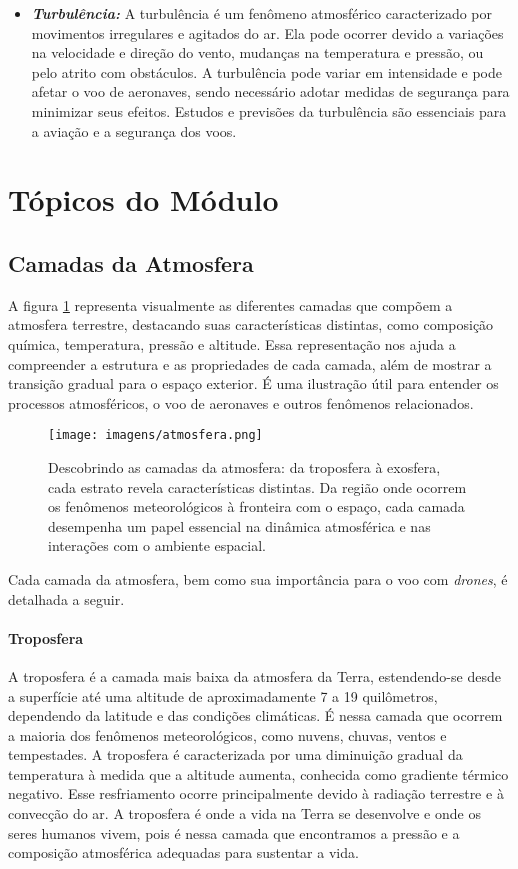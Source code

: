 \documentclass[a4paper, 12pt, onecolumn,singlespacing]{article}
\begin{document}
\begin{itemize}
		\item \textbf{\textit{Turbulência: }} A turbulência é um fenômeno atmosférico caracterizado por movimentos irregulares e agitados do ar. Ela pode ocorrer devido a variações na velocidade e direção do vento, mudanças na temperatura e pressão, ou pelo atrito com obstáculos. A turbulência pode variar em intensidade e pode afetar o voo de aeronaves, sendo necessário adotar medidas de segurança para minimizar seus efeitos. Estudos e previsões da turbulência são essenciais para a aviação e a segurança dos voos.
		
	\end{itemize}

	\section{Tópicos do Módulo}
	
	\subsection{Camadas da Atmosfera}
	
	A figura \ref{fig:atmosfera} representa visualmente as diferentes camadas que compõem a atmosfera terrestre, destacando suas características distintas, como composição química, temperatura, pressão e altitude. Essa representação nos ajuda a compreender a estrutura e as propriedades de cada camada, além de mostrar a transição gradual para o espaço exterior. É uma ilustração útil para entender os processos atmosféricos, o voo de aeronaves e outros fenômenos relacionados.
	
	\begin{figure}[h]
		\centering
		\texttt{[image: imagens/atmosfera.png]}
		\caption{Descobrindo as camadas da atmosfera: da troposfera à exosfera, cada estrato revela características distintas. Da região onde ocorrem os fenômenos meteorológicos à fronteira com o espaço, cada camada desempenha um papel essencial na dinâmica atmosférica e nas interações com o ambiente espacial.}
		\label{fig:atmosfera}
	\end{figure}

	Cada camada da atmosfera, bem como sua importância para o voo com \textit{drones}, é detalhada a seguir.		
		
	\paragraph{Troposfera} A troposfera é a camada mais baixa da atmosfera da Terra, estendendo-se desde a superfície até uma altitude de aproximadamente 7 a 19 quilômetros, dependendo da latitude e das condições climáticas. É nessa camada que ocorrem a maioria dos fenômenos meteorológicos, como nuvens, chuvas, ventos e tempestades. A troposfera é caracterizada por uma diminuição gradual da temperatura à medida que a altitude aumenta, conhecida como gradiente térmico negativo. Esse resfriamento ocorre principalmente devido à radiação terrestre e à convecção do ar. A troposfera é onde a vida na Terra se desenvolve e onde os seres humanos vivem, pois é nessa camada que encontramos a pressão e a composição atmosférica adequadas para sustentar a vida.
	
\end{document}
